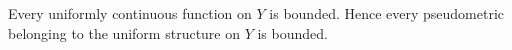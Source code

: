 Every uniformly continuous function on $Y$ is bounded. Hence every pseudometric belonging to the uniform structure on $Y$ is bounded.
